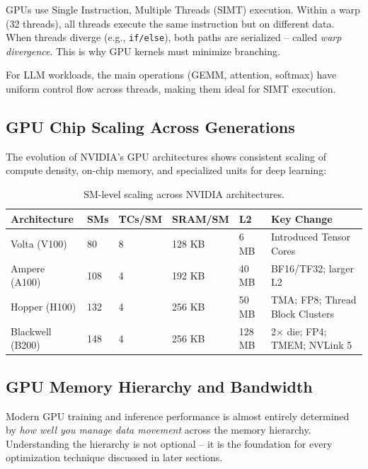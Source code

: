 \begin{intuitionbox}
GPUs use Single Instruction, Multiple Threads (SIMT) execution. Within a warp (32 threads), all threads execute the same instruction but on different data. When threads diverge (e.g., \texttt{if/else}), both paths are serialized -- called \emph{warp divergence}. This is why GPU kernels must minimize branching.

For LLM workloads, the main operations (GEMM, attention, softmax) have uniform control flow across threads, making them ideal for SIMT execution.
\end{intuitionbox}

\subsection{GPU Chip Scaling Across Generations}
\label{gpu-chip-scaling-across-generations}

The evolution of NVIDIA's GPU architectures shows consistent scaling of compute density, on-chip memory, and specialized units for deep learning:

\begin{table}[ht!]
\centering
\caption{SM-level scaling across NVIDIA architectures.}
\begin{tabular}{@{}llllll@{}}
\toprule
\textbf{Architecture} & \textbf{SMs} & \textbf{TCs/SM} & \textbf{SRAM/SM} & \textbf{L2} & \textbf{Key Change} \\
\midrule
Volta (V100) & 80 & 8 & 128 KB & 6 MB & Introduced Tensor Cores \\
Ampere (A100) & 108 & 4 & 192 KB & 40 MB & BF16/TF32; larger L2 \\
Hopper (H100) & 132 & 4 & 256 KB & 50 MB & TMA; FP8; Thread Block Clusters \\
Blackwell (B200) & 148 & 4 & 256 KB & 128 MB & 2$\times$ die; FP4; TMEM; NVLink 5 \\
\bottomrule
\end{tabular}
\end{table}

\subsection{GPU Memory Hierarchy and Bandwidth}
\label{gpu-memory-hierarchy-and-bandwidth}

Modern GPU training and inference performance is almost entirely determined by \emph{how well you manage data movement} across the memory hierarchy. Understanding the hierarchy is not optional -- it is the foundation for every optimization technique discussed in later sections.

